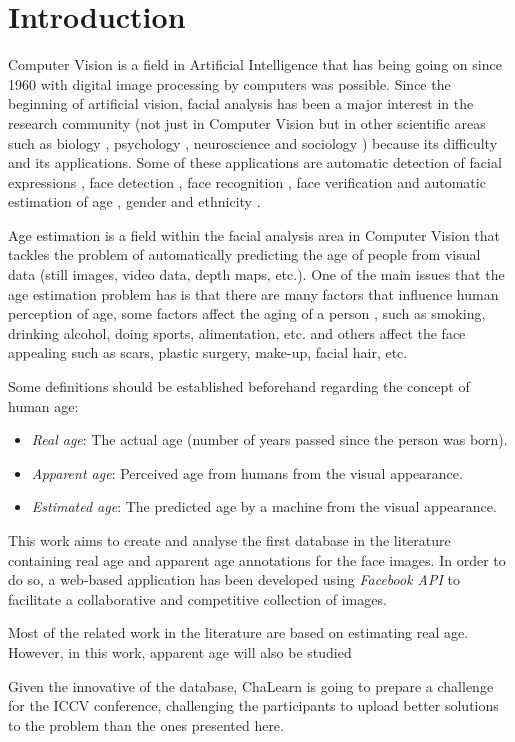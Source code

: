 \chapter{Introduction} \label{chap:introduction}

Computer Vision is a field in Artificial Intelligence that has being going on since 1960 with digital image processing by computers was possible. Since the beginning of artificial vision, facial analysis has been a major interest in the research community (not just in Computer Vision but in other scientific areas such as biology \cite{bhl24064}, psychology \cite{ekm02}, neuroscience \cite{freiwald2009face} and sociology \cite{kemper1978social}) because its difficulty and its applications. Some of these applications are automatic detection of facial expressions \cite{cohen2003facial}, face detection \cite{hsu2002face}, face recognition \cite{wright2009robust}, face verification \cite{taigman2014deepface} and automatic estimation of age \cite{4359348}, gender \cite{alexandre2010gender} and ethnicity \cite{hosoi2004ethnicity}.

Age estimation is a field within the facial analysis area in Computer Vision that tackles the problem of automatically predicting the age of people from visual data (still images, video data, depth maps, etc.). One of the main issues that the age estimation problem has is that there are many factors that influence human perception of age, some factors affect the aging of a person \cite{shephard1997aging}, such as smoking, drinking alcohol, doing sports, alimentation, etc. and others affect the face appealing such as scars, plastic surgery, make-up, facial hair, etc.

Some definitions should be established beforehand regarding the concept of human age:
\begin{itemize}
	\item \textit{Real age}: The actual age (number of years passed since the person was born).
	\item \textit{Apparent age}: Perceived age from humans from the visual appearance. 
	\item \textit{Estimated age}: The predicted age by a machine from the visual appearance.
\end{itemize}

This work aims to create and analyse  the first database in the literature containing real age and apparent age annotations for the face images. In order to do so, a web-based application has been developed using \textit{Facebook API} to facilitate a collaborative and competitive collection of images.


Most of the related work in the literature are based on estimating real age. However, in this work, apparent age will also be studied


Given the innovative of the database, ChaLearn is going to prepare a challenge for the ICCV conference, challenging the participants to upload better solutions to the problem than the ones presented here.
